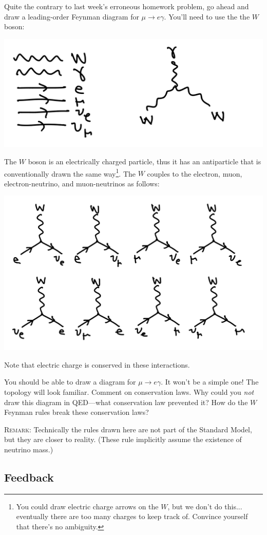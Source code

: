 \documentclass[12pt]{article}
\begin{document}
Quite the contrary to last week's erroneous homework problem, go ahead and draw a leading-order Feynman diagram for $\mu \to e \gamma$. You'll need to use the the $W$ boson:
\begin{center}
\includegraphics[width=.5\textwidth]{HW2bbbb.png}
\end{center}
The $W$ boson is an electrically charged particle, thus it has an antiparticle that is conventionally drawn the same way\footnote{You could draw electric charge arrows on the $W$, but we don't do this... eventually there are too many charges to keep track of. Convince yourself that there's no ambiguity.}. The $W$ couples to the electron, muon, electron-neutrino, and muon-neutrinos as follows:
\begin{center}
	\includegraphics[width=.8\textwidth]{HW2bb.png}
\end{center}
Note that electric charge is conserved in these interactions.



You should be able to draw a diagram for $\mu \to e \gamma$. It won't be a simple one! The topology will look familiar. Comment on conservation laws. Why could you \emph{not} draw this diagram in QED---what conservation law prevented it? How do the $W$ Feynman rules break these conservation laws? 

\textsc{Remark}: Technically the rules drawn here are not part of the Standard Model, but they are closer to reality. (These rule implicitly assume the existence of neutrino mass.)



\subsection{Feedback}
\end{document}
